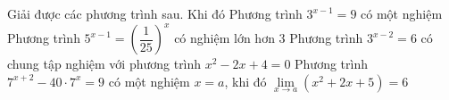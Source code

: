 \begin{ex}%
 Giải được các  phương trình sau. Khi đó
  \choiceTF
  {\True Phương trình $3^{x-1}=9$ có một nghiệm} 
  {Phương trình $5^{x-1}=\left(\dfrac{1}{25}\right)^x$ có nghiệm lớn hơn $3$} 
  {Phương trình $3^{x-2}=6$ có chung tập nghiệm với phương  trình $x^2-2x+4=0$}
  {Phương trình $7^{x+2} -40 \cdot 7^x=9$ có một nghiệm $x=a$, khi đó $\lim\limits_{x \to a} (x^2+2x+5)=6$} 
\end{ex}

